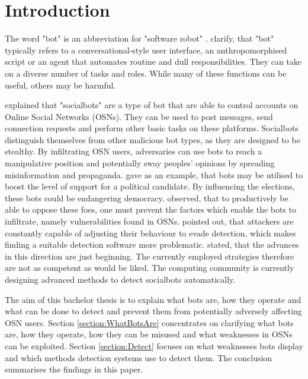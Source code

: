 \section{Introduction}
\label{section:Introduction}
The word "bot" is an abbreviation for "software robot" \autocite[96]{RiseOfSocialBots}.
\textcite[18-19]{SoftwareBots} clarify, that "bot" typically refers to a conversational-style user interface, an anthropomorphised script or an agent that automates routine and dull responsibilities. They can take on a diverse number of tasks and roles. While many of these functions can be useful, others may be harmful.

\textcite[93]{SocialbotNetwork} explained that "socialbots" are a type of bot that are able to control accounts on Online Social Networks (OSNs). They can be used to post messages, send connection requests and perform other basic tasks on these platforms. Socialbots distinguish themselves from other malicious bot types, as they are designed to be stealthy. By infiltrating OSN users, adversaries can use bots to reach a manipulative position and potentially sway peoples' opinions by spreading misinformation and propaganda. \textcite[98]{RiseOfSocialBots} gave as an example, that bots may be utilised to boost the level of support for a political candidate. By influencing the elections, these bots could be endangering democracy. \textcite[559]{DesignAnalysis} observed, that to productively be able to oppose these foes, one must prevent the factors which enable the bots to infiltrate, namely vulnerabilities found in OSNs. \textcite[2]{AidingDetectionFakeAccounts} pointed out, that attackers are constantly capable of adjusting their behaviour to evade detection, which makes finding a suitable detection software more problematic. \textcite[100]{RiseOfSocialBots} stated, that the advances in this direction are just beginning. The currently employed strategies therefore are not as competent as would be liked. The computing community is currently designing advanced methods to detect socialbots automatically. 

The aim of this bachelor thesis is to explain what bots are, how they operate and what can be done to detect and prevent them from potentially adversely affecting OSN users. Section \ref{section:WhatBotsAre} concentrates on clarifying what bots are, how they operate, how they can be misused and what weaknesses in OSNs can be exploited. Section \ref{section:Detect} focuses on what weaknesses bots display and which methods detection systems use to detect them. The conclusion summarises the findings in this paper. 



